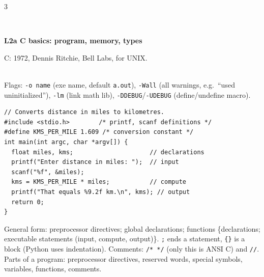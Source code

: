 \documentclass[landscape]{article}
\newcommand{\sect}[1]{\par\vspace{2pt}\noindent{\color{cur}\rule[-1.5pt]{\linewidth}{0.4pt}}\\[-7.5pt]%
  \noindent\colorbox{cur!12}{\parbox{\dimexpr\linewidth-2\fboxsep}{\color{cur}\bfseries #1}}\par\vspace{0.5pt}}
\newcommand{\tc}[1]{\texttt{#1}}
\newlength{\fu}\setlength{\fu}{5.4pt}
\begin{document}
\begin{multicols*}{3}
\sect{L2a \; C basics: program, memory, types}
C: 1972, Dennis Ritchie, Bell Labs, for UNIX.\\
\\
Flags: \tc{-o name} (exe name, default \tc{a.out}), \tc{-Wall} (all warnings, e.g.\ ``used uninitialized''), \tc{-lm} (link math lib), \tc{-DDEBUG}/\tc{-UDEBUG} (define/undefine macro).
\begin{lstlisting}
// Converts distance in miles to kilometres.
#include <stdio.h>        /* printf, scanf definitions */
#define KMS_PER_MILE 1.609 /* conversion constant */
int main(int argc, char *argv[]) {
  float miles, kms;                     // declarations
  printf("Enter distance in miles: ");  // input
  scanf("%f", &miles);
  kms = KMS_PER_MILE * miles;           // compute
  printf("That equals %9.2f km.\n", kms); // output
  return 0;
}
\end{lstlisting}
General form: preprocessor directives; global declarations; functions \{declarations; executable statements (input, compute, output)\}. \tc{;} ends a statement, \tc{\{\}} is a block (Python uses indentation). Comments: \tc{/* */} (only this is ANSI C) and \tc{//}. Parts of a program: preprocessor directives, reserved words, special symbols, variables, functions, comments.


\end{multicols*}
\end{document}
